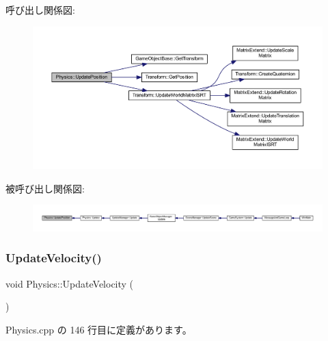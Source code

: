 呼び出し関係図\+:\nopagebreak
\begin{figure}[H]
\begin{center}
\leavevmode
\includegraphics[width=350pt]{class_physics_a481f06d777c1b1f52dc2c06c71e93932_cgraph}
\end{center}
\end{figure}
被呼び出し関係図\+:
\nopagebreak
\begin{figure}[H]
\begin{center}
\leavevmode
\includegraphics[width=350pt]{class_physics_a481f06d777c1b1f52dc2c06c71e93932_icgraph}
\end{center}
\end{figure}
\mbox{\label{class_physics_abd74d6413b1fd6c77007edf51ea9db4b}} 
\subsubsection{\texorpdfstring{Update\+Velocity()}{UpdateVelocity()}}
{\footnotesize\ttfamily void Physics\+::\+Update\+Velocity (\begin{DoxyParamCaption}{ }\end{DoxyParamCaption})\hspace{0.3cm}{\ttfamily [private]}}



 Physics.\+cpp の 146 行目に定義があります。


